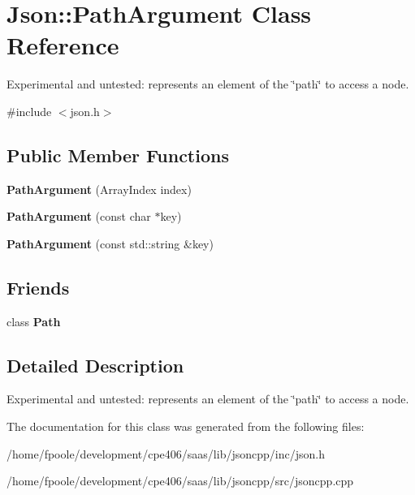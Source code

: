 \hypertarget{class_json_1_1_path_argument}{}\section{Json\+:\+:Path\+Argument Class Reference}
\label{class_json_1_1_path_argument}


Experimental and untested\+: represents an element of the \char`\"{}path\char`\"{} to access a node.  




{\ttfamily \#include $<$json.\+h$>$}

\subsection*{Public Member Functions}
\begin{DoxyCompactItemize}
\item 
\hypertarget{class_json_1_1_path_argument_a53c5b27143b161301b95fd544c139ecf}{}{\bfseries Path\+Argument} (Array\+Index index)\label{class_json_1_1_path_argument_a53c5b27143b161301b95fd544c139ecf}

\item 
\hypertarget{class_json_1_1_path_argument_a9690417a8a40e6e49f2acdf6c9281345}{}{\bfseries Path\+Argument} (const char $\ast$key)\label{class_json_1_1_path_argument_a9690417a8a40e6e49f2acdf6c9281345}

\item 
\hypertarget{class_json_1_1_path_argument_a08f872cfee4fc600f7fa3bcaaff0d41c}{}{\bfseries Path\+Argument} (const std\+::string \&key)\label{class_json_1_1_path_argument_a08f872cfee4fc600f7fa3bcaaff0d41c}

\end{DoxyCompactItemize}
\subsection*{Friends}
\begin{DoxyCompactItemize}
\item 
\hypertarget{class_json_1_1_path_argument_a4877239a6b7f09fbf5a61ca68a49d74c}{}class {\bfseries Path}\label{class_json_1_1_path_argument_a4877239a6b7f09fbf5a61ca68a49d74c}

\end{DoxyCompactItemize}


\subsection{Detailed Description}
Experimental and untested\+: represents an element of the \char`\"{}path\char`\"{} to access a node. 

The documentation for this class was generated from the following files\+:\begin{DoxyCompactItemize}
\item 
/home/fpoole/development/cpe406/saas/lib/jsoncpp/inc/json.\+h\item 
/home/fpoole/development/cpe406/saas/lib/jsoncpp/src/jsoncpp.\+cpp\end{DoxyCompactItemize}
